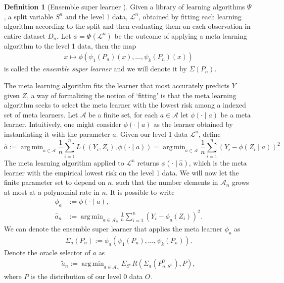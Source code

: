 \documentclass[11pt, a4paper]{article}
\DeclareMathOperator*{\argmin}{arg\,min}
\theoremstyle{definition}
\newtheorem{definition}[theorem]{Definition}
\theoremstyle{remark}
\newcommand{\la}{\psi}
\newcommand{\Sn}{S^n}
\newcommand{\lib}{\Psi}
\newcommand{\lone}{\mathcal{L}}
\newcommand{\meta}{\phi}
\newcommand{\Meta}{\Phi}
\newcommand{\esl}{\Sigma}
\begin{document}
\begin{definition}[Ensemble super learner \parencite{van2007super}]
    Given a library of learning algorithms $ \lib $, a split variable $ \Sn $ and the level 1 data, $ \lone^{n} $, obtained by fitting each learning algorithm according to the split and then evaluating them on each observation in entire dataset $ D_n $.
    Let $ \meta = \Meta(\lone^{n}) $ be the outcome of applying a meta learning algorithm to the level 1 data, then the map 
    \begin{align*}
       x \mapsto \meta(\la_1(P_{n})(x), \ldots, \la_k(P_{n})(x) )
    \end{align*}
    is called the \textit{ensemble super learner} and we will denote it by $ \esl(P_{n}) $. 
\end{definition}
The meta learning algorithm fits the learner that most accurately predicts $ Y $ given $ Z $, a way of formalizing the notion of `fitting' is that the meta learning algorithm seeks to select the meta learner with the lowest risk among a indexed set of meta learners. Let $ \mathcal{A} $ be a finite set, for each $ a \in \mathcal{A} $ let $ \meta( \cdot \mid a) $ be a meta learner. Intuitively, one might consider $ \meta( \cdot \mid a) $ as the learner obtained by instantiating it with the parameter $ a $. Given our level 1 data $ \lone^{n} $, define 
$$ \hat{a} := \argmin_{a \in \mathcal{A}} \frac{1}{n} \sum_{i = 1}^{n} L((Y_i, Z_i), \meta( \cdot \mid a)) = \argmin_{a \in \mathcal{A}} \frac{1}{n} \sum_{i = 1}^{n} (Y_i - \meta(Z_i \mid a))^2 $$
The meta learning algorithm applied to $ \lone^{n} $ returns $ \meta(\cdot \mid \hat{a}) $, which is the meta learner with the empirical lowest risk on the level 1 data. We will now let the finite parameter set to depend on $ n $, such that the number elements in $ \mathcal{A}_{n} $ grows at most at a polynomial rate in $ n $. It is possible to write 
\begin{align*}
    \meta_{ a } &:= \meta(\cdot \mid a ),\\
    \hat{a}_n &:= \argmin_{a \in \mathcal{A}_{n}} \frac{1}{n} \sum_{i = 1}^{n} (Y_i - \meta_{a}(Z_i))^2.
\end{align*}
We can denote the ensemble super learner that applies the meta learner $ \meta_{ a } $ as 
\begin{align*}
    \esl_{a}(P_{n}) := \meta_{a}(\la_1(P_{n}), \ldots, \la_k(P_{n})).
\end{align*}
Denote the oracle selector of $ a $ as 
\begin{align*}
    \tilde{a}_n := \argmin_{a \in \mathcal{A}_n} E_{\Sn} R(\esl_{a}(P_{n, S^{n}}^{0}) , P),
\end{align*}
where $ P $ is the distribution of our level 0 data $ O $.
\end{document}
